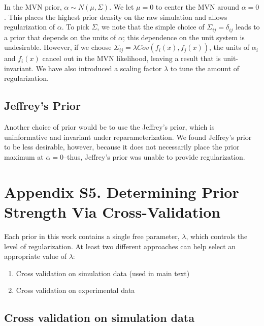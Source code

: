 \documentclass[12pt]{article}
\begin{document}
In the MVN prior, $\alpha \sim N(\mu,\Sigma)$.  We let $\mu = 0$ to center the MVN around $\alpha = 0$.  This places the highest prior density on the raw simulation and allows regularization of $\alpha$.  To pick $\Sigma$, we note that the simple choice of $\Sigma_{ij} = \delta_{ij}$ leads to a prior that depends on the units of $\alpha$; this dependence on the unit system is undesirable.  However, if we choose $\Sigma_{ij} = \lambda Cov(f_i(x), f_j(x))$, the units of $\alpha_i$ and $f_i(x)$ cancel out in the MVN likelihood, leaving a result that is unit-invariant.  We have also introduced a scaling factor $\lambda$ to tune the amount of regularization.


\subsection*{Jeffrey's Prior}

Another choice of prior would be to use the Jeffrey's prior, which is uninformative and invariant under reparameterization.  We found Jeffrey's prior to be less desirable, however, because it does not necessarily place the prior maximum at $\alpha = 0$--thus, Jeffrey's prior was unable to provide regularization. 

\newpage

\section*{Appendix S5.  Determining Prior Strength Via Cross-Validation}

Each prior in this work contains a single free parameter, $\lambda$, which controls the level of regularization.  At least two different approaches can help select an appropriate value of $\lambda$:

\begin{enumerate}
 \item Cross validation on simulation data (used in main text)
 \item Cross validation on experimental data
\end{enumerate}

\subsection*{Cross validation on simulation data}
\end{document}
